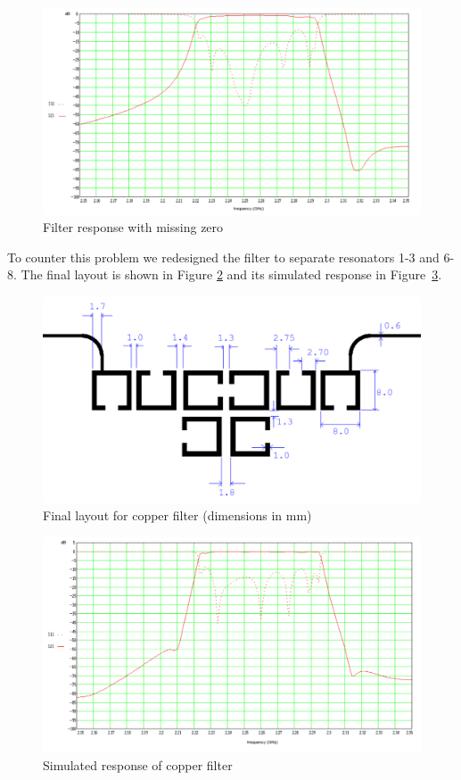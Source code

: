 \begin{figure}[ht]
\begin{center}
\includegraphics[scale=0.4]{fig/design-bad-8-pole-response.pdf}
\end{center}
\caption{Filter response with missing zero}
\label{figure:filter-missing-zero-response}
\end{figure}

To counter this problem we redesigned the filter to separate resonators 1-3 and 6-8. The final layout is shown in Figure \ref{figure:design-copper-layout} and its simulated response in Figure~\ref{figure:design-copper-response}.


\begin{figure}[ht]
\begin{center}
\includegraphics[scale=0.4]{fig/design-copper-layout.pdf}
\end{center}
\caption{ Final layout for copper filter (dimensions in mm)}
\label{figure:design-copper-layout}
\end{figure}

\begin{figure}[ht]
\begin{center}
\includegraphics[scale=0.4]{fig/design-copper-simulated.pdf}
\end{center}
\caption{Simulated response of copper filter}
\label{figure:design-copper-response}
\end{figure}

